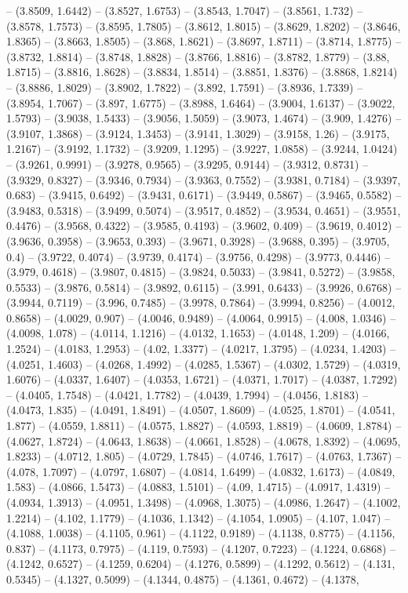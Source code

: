 -- (3.8509, 1.6442) -- (3.8527, 1.6753) -- (3.8543, 1.7047) -- (3.8561, 1.732) -- (3.8578, 1.7573) -- (3.8595, 1.7805) -- (3.8612, 1.8015) -- (3.8629, 1.8202) -- (3.8646, 1.8365) -- (3.8663, 1.8505) -- (3.868, 1.8621) -- (3.8697, 1.8711) -- (3.8714, 1.8775) -- (3.8732, 1.8814) -- (3.8748, 1.8828) -- (3.8766, 1.8816) -- (3.8782, 1.8779) -- (3.88, 1.8715) -- (3.8816, 1.8628) -- (3.8834, 1.8514) -- (3.8851, 1.8376) -- (3.8868, 1.8214) -- (3.8886, 1.8029) -- (3.8902, 1.7822) -- (3.892, 1.7591) -- (3.8936, 1.7339) -- (3.8954, 1.7067) -- (3.897, 1.6775) -- (3.8988, 1.6464) -- (3.9004, 1.6137) -- (3.9022, 1.5793) -- (3.9038, 1.5433) -- (3.9056, 1.5059) -- (3.9073, 1.4674) -- (3.909, 1.4276) -- (3.9107, 1.3868) -- (3.9124, 1.3453) -- (3.9141, 1.3029) -- (3.9158, 1.26) -- (3.9175, 1.2167) -- (3.9192, 1.1732) -- (3.9209, 1.1295) -- (3.9227, 1.0858) -- (3.9244, 1.0424) -- (3.9261, 0.9991) -- (3.9278, 0.9565) -- (3.9295, 0.9144) -- (3.9312, 0.8731) -- (3.9329, 0.8327) -- (3.9346, 0.7934) -- (3.9363, 0.7552) -- (3.9381, 0.7184) -- (3.9397, 0.683) -- (3.9415, 0.6492) -- (3.9431, 0.6171) -- (3.9449, 0.5867) -- (3.9465, 0.5582) -- (3.9483, 0.5318) -- (3.9499, 0.5074) -- (3.9517, 0.4852) -- (3.9534, 0.4651) -- (3.9551, 0.4476) -- (3.9568, 0.4322) -- (3.9585, 0.4193) -- (3.9602, 0.409) -- (3.9619, 0.4012) -- (3.9636, 0.3958) -- (3.9653, 0.393) -- (3.9671, 0.3928) -- (3.9688, 0.395) -- (3.9705, 0.4) -- (3.9722, 0.4074) -- (3.9739, 0.4174) -- (3.9756, 0.4298) -- (3.9773, 0.4446) -- (3.979, 0.4618) -- (3.9807, 0.4815) -- (3.9824, 0.5033) -- (3.9841, 0.5272) -- (3.9858, 0.5533) -- (3.9876, 0.5814) -- (3.9892, 0.6115) -- (3.991, 0.6433) -- (3.9926, 0.6768) -- (3.9944, 0.7119) -- (3.996, 0.7485) -- (3.9978, 0.7864) -- (3.9994, 0.8256) -- (4.0012, 0.8658) -- (4.0029, 0.907) -- (4.0046, 0.9489) -- (4.0064, 0.9915) -- (4.008, 1.0346) -- (4.0098, 1.078) -- (4.0114, 1.1216) -- (4.0132, 1.1653) -- (4.0148, 1.209) -- (4.0166, 1.2524) -- (4.0183, 1.2953) -- (4.02, 1.3377) -- (4.0217, 1.3795) -- (4.0234, 1.4203) -- (4.0251, 1.4603) -- (4.0268, 1.4992) -- (4.0285, 1.5367) -- (4.0302, 1.5729) -- (4.0319, 1.6076) -- (4.0337, 1.6407) -- (4.0353, 1.6721) -- (4.0371, 1.7017) -- (4.0387, 1.7292) -- (4.0405, 1.7548) -- (4.0421, 1.7782) -- (4.0439, 1.7994) -- (4.0456, 1.8183) -- (4.0473, 1.835) -- (4.0491, 1.8491) -- (4.0507, 1.8609) -- (4.0525, 1.8701) -- (4.0541, 1.877) -- (4.0559, 1.8811) -- (4.0575, 1.8827) -- (4.0593, 1.8819) -- (4.0609, 1.8784) -- (4.0627, 1.8724) -- (4.0643, 1.8638) -- (4.0661, 1.8528) -- (4.0678, 1.8392) -- (4.0695, 1.8233) -- (4.0712, 1.805) -- (4.0729, 1.7845) -- (4.0746, 1.7617) -- (4.0763, 1.7367) -- (4.078, 1.7097) -- (4.0797, 1.6807) -- (4.0814, 1.6499) -- (4.0832, 1.6173) -- (4.0849, 1.583) -- (4.0866, 1.5473) -- (4.0883, 1.5101) -- (4.09, 1.4715) -- (4.0917, 1.4319) -- (4.0934, 1.3913) -- (4.0951, 1.3498) -- (4.0968, 1.3075) -- (4.0986, 1.2647) -- (4.1002, 1.2214) -- (4.102, 1.1779) -- (4.1036, 1.1342) -- (4.1054, 1.0905) -- (4.107, 1.047) -- (4.1088, 1.0038) -- (4.1105, 0.961) -- (4.1122, 0.9189) -- (4.1138, 0.8775) -- (4.1156, 0.837) -- (4.1173, 0.7975) -- (4.119, 0.7593) -- (4.1207, 0.7223) -- (4.1224, 0.6868) -- (4.1242, 0.6527) -- (4.1259, 0.6204) -- (4.1276, 0.5899) -- (4.1292, 0.5612) -- (4.131, 0.5345) -- (4.1327, 0.5099) -- (4.1344, 0.4875) -- (4.1361, 0.4672) -- (4.1378, 